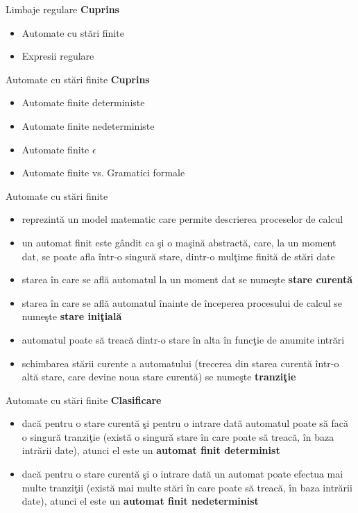 \documentclass[pdf]{beamer}
\begin{document}



\begin{frame}{Limbaje regulare}
\textbf{Cuprins}
\begin{itemize}
\item
Automate cu stări finite
\item
Expresii regulare
\end{itemize}
\end{frame}



\begin{frame}{Automate cu stări finite}
\textbf{Cuprins}
\begin{itemize}
\item
Automate finite deterministe
\item
Automate finite nedeterministe
\item
Automate finite $\epsilon$
\item
Automate finite vs. Gramatici formale
\end{itemize}
\end{frame}



\begin{frame}{Automate cu stări finite}
\begin{itemize}
\item
reprezintă un model matematic care permite descrierea proceselor de calcul
\item
un automat finit este gândit ca şi o maşină abstractă, care, la un moment dat, se poate afla într-o singură stare, dintr-o mulţime finită de stări date
\item
starea în care se află automatul la un moment dat se numeşte \textbf{stare curentă}
\item
starea în care se află automatul înainte de începerea procesului de calcul se numeşte \textbf{stare iniţială}
\item
automatul poate să treacă dintr-o stare în alta în funcţie de anumite intrări
\item
schimbarea stării curente a automatului (trecerea din starea curentă într-o altă stare, care devine noua stare curentă) se numeşte \textbf{tranziţie}
\end{itemize}
\end{frame}



\begin{frame}{Automate cu stări finite}
\textbf{Clasificare}
\begin{itemize}
\item
dacă pentru o stare curentă şi pentru o intrare dată automatul poate să facă o singură tranziţie (există o singură stare în care poate să treacă, în baza intrării date), atunci el este un \textbf{automat finit determinist}
\item
dacă pentru o stare curentă şi o intrare dată un automat poate efectua mai multe tranziţii (există mai multe stări în care poate să treacă, în baza intrării date), atunci el este un \textbf{automat finit nedeterminist}
\end{itemize}
\end{frame}
\end{document}
